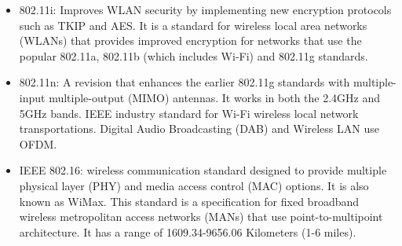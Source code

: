\begin{itemize}
\begin{itemize}
        \item 802.11i: Improves WLAN security by implementing new encryption protocols such as TKIP and AES. It is a standard for wireless local area networks (WLANs) that provides improved encryption for networks that use the popular 802.11a, 802.11b (which includes Wi-Fi) and 802.11g standards.
        \item 802.11n: A revision that enhances the earlier 802.11g standards with multiple-input multiple-output (MIMO) antennas. It works in both the 2.4GHz and 5GHz bands. IEEE industry standard for Wi-Fi wireless local network transportations. Digital Audio Broadcasting (DAB) and Wireless LAN use OFDM.
        \item IEEE 802.16: wireless communication standard designed to provide multiple physical layer (PHY) and media access control (MAC) options. It is also known as WiMax. This standard is a specification for fixed broadband wireless metropolitan access networks (MANs) that use point-to-multipoint architecture. It has a range of 1609.34-9656.06 Kilometers (1-6 miles).
    \end{itemize}
\end{itemize}
